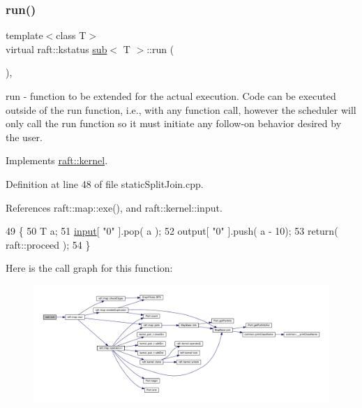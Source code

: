 \subsubsection{\texorpdfstring{run()}{run()}\hspace{0.1cm}{\footnotesize\ttfamily [6/12]}}
{\footnotesize\ttfamily template$<$class T$>$ \\
virtual raft\+::kstatus \hyperlink{classsub}{sub}$<$ T $>$\+::run (\begin{DoxyParamCaption}{ }\end{DoxyParamCaption})\hspace{0.3cm}{\ttfamily [inline]}, {\ttfamily [virtual]}}

run -\/ function to be extended for the actual execution. Code can be executed outside of the run function, i.\+e., with any function call, however the scheduler will only call the run function so it must initiate any follow-\/on behavior desired by the user. 

Implements \hyperlink{classraft_1_1kernel_a05094286d7577360fb1b91c91fc05901}{raft\+::kernel}.



Definition at line 48 of file static\+Split\+Join.\+cpp.



References raft\+::map\+::exe(), and raft\+::kernel\+::input.


\begin{DoxyCode}
49     \{
50         T a;
51         \hyperlink{classraft_1_1kernel_a6edbe35a56409d402e719b3ac36d6554}{input}[ \textcolor{stringliteral}{"0"} ].pop( a );
52         output[ \textcolor{stringliteral}{"0"} ].push( a - 10);
53         \textcolor{keywordflow}{return}( raft::proceed );
54     \}
\end{DoxyCode}
Here is the call graph for this function\+:
\nopagebreak
\begin{figure}[H]
\begin{center}
\leavevmode
\includegraphics[width=350pt]{classsub_a0a0c7461433ee8b5f4b24305282bf69a_cgraph}
\end{center}
\end{figure}
\hypertarget{classsub_a0a0c7461433ee8b5f4b24305282bf69a}{}\label{classsub_a0a0c7461433ee8b5f4b24305282bf69a} 
